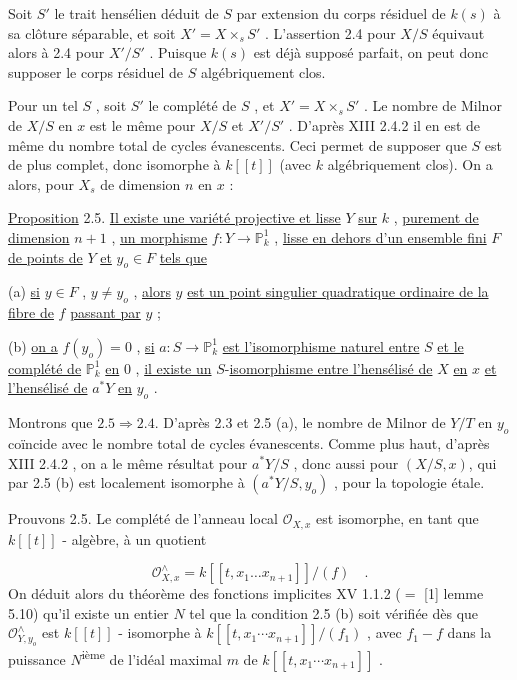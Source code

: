 Soit $S'$ le trait hensélien déduit de $S$ par extension du corps résiduel de $k(s)$ à sa clôture séparable, et soit $X' = X \times_s S'$ . L'assertion 2.4 pour $X/S$ équivaut alors à 2.4 pour $X'/S'$ . Puisque $k(s)$ est déjà supposé parfait, on peut donc supposer le corps résiduel de $S$ algébriquement clos.

Pour un tel $S$ , soit $S'$ le complété de $S$ , et $X' = X \times_s S'$ . Le nombre de Milnor de $X/S$ en $x$ est le même pour $X/S$ et $X'/S'$ . D'après XIII 2.4.2 il en est de même du nombre total de cycles évanescents. Ceci permet de supposer que $S$ est de plus complet, donc isomorphe à $k[[t]]$ (avec $k$ algébriquement clos). On a alors, pour $X_s$ de dimension $n$ en $x$ :

\underline{Proposition} 2.5. \underline{Il existe une variété projective et lisse} $Y$ \underline{sur} $k$ , \underline{purement de dimension} $n + 1$ , \underline{un morphisme} $f : Y \to \mathbb{P}^1_k$ , \underline{lisse en dehors d'un ensemble fini} $F$
\underline{de points de} $Y$ \underline{et} $y_o \in F$ \underline{tels que}

(a) \underline{si} $y \in F$ , $y \neq y_o$ , \underline{alors} $y$ \underline{est un point singulier quadratique ordinaire de la fibre de} $f$ \underline{passant par} $y$ ;

(b) \underline{on a} $f(y_o) = 0$ , \underline{si} $a : S \to \mathbb{P}^1_k$ \underline{est l'isomorphisme naturel entre} $S$ \underline{et le complété de} $\mathbb{P}^1_k$ \underline{en} $0$ , \underline{il existe un} $S$-\underline{isomorphisme entre l'hensélisé de} $X$ \underline{en} $x$ \underline{et l'hensélisé de} $a^{*}Y$ \underline{en} $y_o$ .

Montrons que $2.5 \Rightarrow 2.4$. D'après 2.3 et 2.5 (a), le nombre de Milnor de $Y/T$ en $y_o$ coïncide avec le nombre total de cycles évanescents. Comme plus haut, d'après XIII 2.4.2 , on a le même résultat pour $a^{*}Y/S$ , donc aussi pour $(X/S,x)$, qui par 2.5 (b) est localement isomorphe à $(a^{*} Y/S,y_o)$ , pour la topologie étale.

Prouvons 2.5. Le complété de l'anneau local $\mathcal{O}_{X,x}$ est isomorphe, en tant que $k[[t]]$ - algèbre, à un quotient

\begin{equation*}
\mathcal{O}_{X,x}^{\wedge} = k[[t,x_1 \ldots x_{n+1}]]/(f) \quad .
\end{equation*}
On déduit alors du théorème des fonctions implicites XV 1.1.2 ($=$ [1] lemme 5.10) qu'il existe un entier $N$ tel que la condition 2.5 (b) soit vérifiée dès que $\mathcal{O}_{Y,y_o}^{\wedge}$ est $k[[t]]$ - isomorphe à $k[[t,x_1 \cdots x_{n+1}]]/(f_1)$ , avec $f_1 - f$ dans la puissance $N$\textsuperscript{ième} de l'idéal maximal $m$ de $k[[t,x_1 \cdots x_{n+1}]]$ .

